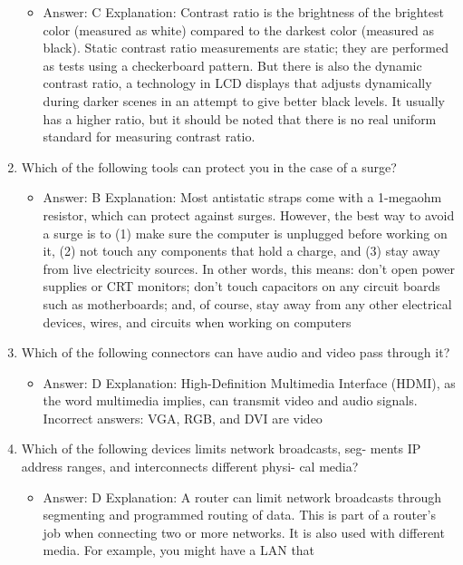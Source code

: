\documentclass{article}
\begin{document}
\begin{enumerate}
    \begin{itemize}
        \item Answer: C
Explanation: Contrast ratio is the brightness of the brightest color (measured as white)
compared to the darkest color (measured as black). Static contrast ratio measurements
are static; they are performed as tests using a checkerboard pattern. But there is also
the dynamic contrast ratio, a technology in LCD displays that adjusts dynamically during
darker scenes in an attempt to give better black levels. It usually has a higher ratio,
but it should be noted that there is no real uniform standard for measuring contrast
ratio.
    \end{itemize}
    \item Which of the following tools can protect you in the case of a
surge?
    \begin{itemize}
        \item Answer: B
Explanation: Most antistatic straps come with a 1-megaohm resistor, which can protect
against surges. However, the best way to avoid a surge is to (1) make sure the
computer is unplugged before working on it, (2) not touch any components that hold
a charge, and (3) stay away from live electricity sources. In other words, this means:
don’t open power supplies or CRT monitors; don’t touch capacitors on any circuit
boards such as motherboards; and, of course, stay away from any other electrical
devices, wires, and circuits when working on computers
    \end{itemize}
    \item Which of the following connectors can have audio and video pass
through it?
    \begin{itemize}
        \item Answer: D
Explanation: High-Definition Multimedia Interface (HDMI), as the word multimedia
implies, can transmit video and audio signals.
Incorrect answers: VGA, RGB, and DVI are video
    \end{itemize}
    \item Which of the following devices limits network broadcasts, seg-
ments IP address ranges, and interconnects different physi-
cal media?
    \begin{itemize}
        \item Answer: D
Explanation: A router can limit network broadcasts through segmenting and programmed
routing of data. This is part of a router’s job when connecting two or more
networks. It is also used with different media. For example, you might have a LAN that

\end{itemize}
\end{enumerate}
\end{document}
